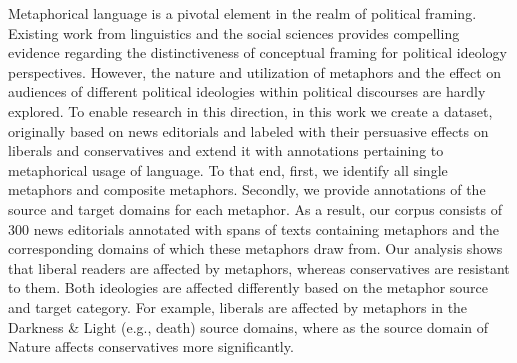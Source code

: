 Metaphorical language is a pivotal element in the realm of political framing. Existing work from linguistics and the social sciences provides compelling evidence regarding the distinctiveness of conceptual framing for political ideology perspectives. However, the nature and utilization of metaphors and the effect on audiences of different political ideologies within political discourses are hardly explored. To enable research in this direction, in this work we create a dataset, originally based on news editorials and labeled with their persuasive effects on liberals and conservatives and extend it with annotations pertaining to metaphorical usage of language. To that end, first, we identify all single metaphors and composite metaphors. Secondly, we provide annotations of the source and target domains for each metaphor. As a result, our corpus consists of 300 news editorials annotated with spans of texts containing metaphors and the corresponding domains of which these metaphors draw from. Our analysis shows that liberal readers are affected by metaphors, whereas conservatives are resistant to them. Both ideologies are affected differently based on the metaphor source and target category. For example, liberals are affected by metaphors in the Darkness \& Light (e.g., death) source domains, where as the source domain of Nature affects conservatives more significantly.